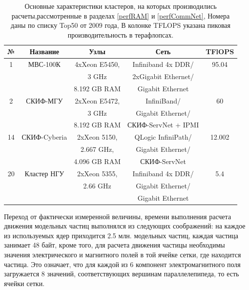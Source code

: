 \begin{table}[ht]
\caption{
Основные характеристики кластеров, на которых производились расчеты,рассмотренные в разделах \ref{perfRAM} и \ref{perfCommNet}, Номера даны по списку Top50 от 2009 года, В колонке TFLOPS указана пиковая производительность в терафлопсах.}
	\begin{center}
		\begin{tabular}{|c|c|c|c|c|}
			\hline
			№                 & Название & Узлы               & Сеть                                   &  TFlOPS\\
		          \hline 
			1                & МВС-100К & 4xXeon E5450,      &  Infiniband 4x DDR/                    & 95.04 \\
			&          & 3 GHz              &  2xGigabit Ethernet/                   &       \\
			&          & 8.192 GB RAM       &  Gigabit Ethernet                      &    \\ \hline 
			2                 & СКИФ-МГУ & 2xXeon E5472,      & InfiniBand/                             & 60   \\
			&          &   3 GHz            & Gigabit Ethernet/                       &      \\
			&          &  8.192 GB RAM      & СКИФ-ServNet + IPMI                    &   \\ \hline 
			14                & СКИФ-Cyberia & 2xXeon 5150,   &  QLogic InfiniPath/                     & 12.002 \\
			&              &  2.667 GHz,    & Gigabit Ethernet/                       &   \\
			&           &     4.096 GB RAM  & СКИФ-ServNet                            & \\ \hline 
			20                & Кластер НГУ & 2xXeon 5355,    &  Infiniband 4x DDR/                    & 5.4 \\ 
			&           & 2.66 GHz          &   Gigabit Ethernet/                    &  \\
			&           &                   &   Gigabit Ethernet                     &  \\ \hline 
			
		\end{tabular}
	\end{center}

	\label{top50_2010}
\end{table}

Переход от фактически измеренной величины, времени выполнения расчета движения модельных частиц выполнялся из следующих соображений: на каждое из используемых ядер приходится 2.5 млн. модельных частиц, каждая частица занимает 48 байт, кроме того, для расчета движения частицы необходимы значения электрического и магнитного полей в той ячейке сетки, где находится частица. Это означает, что для каждой из 6 компонент электромагнитного поля загружается 8 значений, соответствующих вершинам параллелепипеда, то есть ячейки сетки. 

